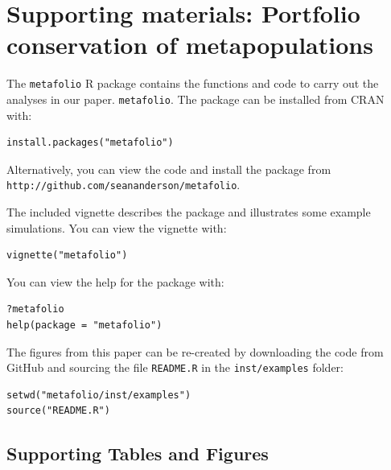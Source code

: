 \section{Supporting materials: Portfolio conservation of metapopulations}


\noindent
The \texttt{metafolio} \textsf{R} package contains the functions and
code to carry out the analyses in our paper. \texttt{metafolio}. The
package can be installed from CRAN with:

\begin{verbatim}
install.packages("metafolio")
\end{verbatim}

\noindent
Alternatively, you can view the code and install the package from\\
\texttt{http://github.com/seananderson/metafolio}.

\noindent
The included vignette describes the package and illustrates some example
simulations. You can view the vignette with:

\begin{verbatim}
vignette("metafolio")
\end{verbatim}

\noindent
You can view the help for the package with:

\begin{verbatim}
?metafolio
help(package = "metafolio")
\end{verbatim}

\noindent
The figures from this paper can be re-created by downloading the code
from GitHub and sourcing the file \texttt{README.R} in the
\texttt{inst/examples} folder:

\begin{verbatim}
setwd("metafolio/inst/examples")
source("README.R")
\end{verbatim}

\clearpage


% 
% 

\subsection{Supporting Tables and Figures}


